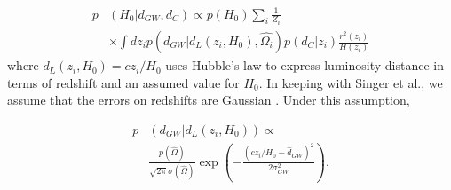 \begin{align}
     p&(H_0|d_{GW}, d_C)\propto p(H_0) \sum_i \frac{1}{Z_i} \nonumber\\
     &\times \int dz_i p\left(d_{GW}|d_L(z_i, H_0), \hat{\Omega_{i}}\right)p(d_C|z_i)\frac{r^2 (z_i)}{H(z_i)}
    \label{eq: finaleq}
\end{align}
where $d_L(z_i, H_0) = cz_i / H_0$ uses Hubble's law to express luminosity distance in terms of redshift and an assumed value for $H_0$. In keeping with Singer et al., we assume that the errors on redshifts are Gaussian \cite{Singer_2016}. Under this assumption,

\begin{align}
    p&\left(d_{GW}|d_L(z_i, H_0)\right)\propto \nonumber\\
    &\frac{p(\hat{\Omega})}{\sqrt{2\pi}\sigma(\hat{\Omega})} \exp\left(-\frac{(cz_i/H_0 - \hat{d}_{GW})^2}{2\sigma_{GW}^2}\right).
    \label{eq:GW_like}
\end{align}
